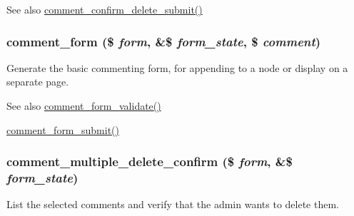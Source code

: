 \begin{DoxySeeAlso}{See also}
\hyperlink{comment_8admin_8inc_a4a91e7877e246726a22e875c215845bd}{comment\_\-confirm\_\-delete\_\-submit()} 
\end{DoxySeeAlso}
\hypertarget{group__forms_ga86e714d86cac517f85b3cadf42ba2977}{
\subsubsection[{comment\_\-form}]{\setlength{\rightskip}{0pt plus 5cm}comment\_\-form (\$ {\em form}, \/  \&\$ {\em form\_\-state}, \/  \$ {\em comment})}}
\label{group__forms_ga86e714d86cac517f85b3cadf42ba2977}
Generate the basic commenting form, for appending to a node or display on a separate page.

\begin{DoxySeeAlso}{See also}
\hyperlink{comment_8module_a37f7362a827269fc4d3f11bf4feae277}{comment\_\-form\_\-validate()} 

\hyperlink{comment_8module_abb91789dc7f908120219fc645e7e1612}{comment\_\-form\_\-submit()} 
\end{DoxySeeAlso}
\hypertarget{group__forms_ga9c94271c79747235e0914e4f0ee9be8e}{
\subsubsection[{comment\_\-multiple\_\-delete\_\-confirm}]{\setlength{\rightskip}{0pt plus 5cm}comment\_\-multiple\_\-delete\_\-confirm (\$ {\em form}, \/  \&\$ {\em form\_\-state})}}
\label{group__forms_ga9c94271c79747235e0914e4f0ee9be8e}
List the selected comments and verify that the admin wants to delete them.


